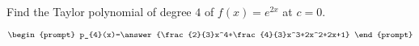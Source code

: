 \documentclass{ximera}
\author{Gregory Hartman \and Matthew Carr}
\begin{document}
\begin{exercise}




Find the Taylor polynomial of degree $4$ of $f(x)=e^{2x}$ at $c=0$.

\[
\begin{prompt}
p_{4}(x)=\answer{\frac{2}{3}x^4+\frac{4}{3}x^3+2x^2+2x+1}
\end{prompt}
\]

\end{exercise}
\end{document}
